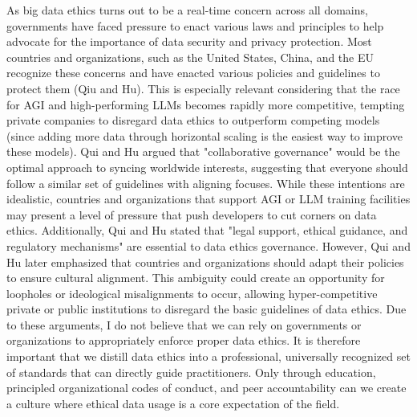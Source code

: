 \documentclass[12pt]{article}
\begin{document}
\begin{text}
As big data ethics turns out to be a real-time concern across all domains, governments have faced pressure to enact various laws and principles to help advocate for the importance of data security and privacy protection. Most countries and organizations, such as the United States, China, and the EU recognize these concerns and have enacted various policies and guidelines to protect them (Qiu and Hu). This is especially relevant considering that the race for AGI and high-performing LLMs becomes rapidly more competitive, tempting private companies to disregard data ethics to outperform competing models (since adding more data through horizontal scaling is the easiest way to improve these models). Qui and Hu argued that "collaborative governance" would be the optimal approach to syncing worldwide interests, suggesting that everyone should follow a similar set of guidelines with aligning focuses. While these intentions are idealistic, countries and organizations that support AGI or LLM training facilities may present a level of pressure that push developers to cut corners on data ethics. Additionally, Qui and Hu stated that "legal support, ethical guidance, and regulatory mechanisms" are essential to data ethics governance. However, Qui and Hu later emphasized that countries and organizations should adapt their policies to ensure cultural alignment. This ambiguity could create an opportunity for loopholes or ideological misalignments to occur, allowing hyper-competitive private or public institutions to disregard the basic guidelines of data ethics. Due to these arguments, I do not believe that we can rely on governments or organizations to appropriately enforce proper data ethics. It is therefore important that we distill data ethics into a professional, universally recognized set of standards that can directly guide practitioners. Only through education, principled organizational codes of conduct, and peer accountability can we create a culture where ethical data usage is a core expectation of the field.


\end{text}
\end{document}
